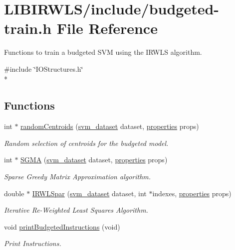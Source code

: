 \hypertarget{budgeted-train_8h}{}\section{L\+I\+B\+I\+R\+W\+L\+S/include/budgeted-\/train.h File Reference}
\label{budgeted-train_8h}


Functions to train a budgeted S\+VM using the I\+R\+W\+LS algorithm.  


{\ttfamily \#include \char`\"{}I\+O\+Structures.\+h\char`\"{}}\\*
\subsection*{Functions}
\begin{DoxyCompactItemize}
\item 
int $\ast$ \hyperlink{budgeted-train_8h_aa6c8aa8b86b7a0647cc679408c310cd3}{random\+Centroids} (\hyperlink{structsvm__dataset}{svm\+\_\+dataset} dataset, \hyperlink{structproperties}{properties} props)
\begin{DoxyCompactList}\small\item\em Random selection of centroids for the budgeted model. \end{DoxyCompactList}\item 
int $\ast$ \hyperlink{budgeted-train_8h_a50a6e1f36a010feb91db9b9b38679948}{S\+G\+MA} (\hyperlink{structsvm__dataset}{svm\+\_\+dataset} dataset, \hyperlink{structproperties}{properties} props)
\begin{DoxyCompactList}\small\item\em Sparse Greedy Matrix Approximation algorithm. \end{DoxyCompactList}\item 
double $\ast$ \hyperlink{budgeted-train_8h_ad51d9a46645ad0b0bedb1113a3807d24}{I\+R\+W\+L\+Spar} (\hyperlink{structsvm__dataset}{svm\+\_\+dataset} dataset, int $\ast$indexes, \hyperlink{structproperties}{properties} props)
\begin{DoxyCompactList}\small\item\em Iterative Re-\/\+Weighted Least Squares Algorithm. \end{DoxyCompactList}\item 
void \hyperlink{budgeted-train_8h_a9888789b1c3595806cf34f033fb2aff9}{print\+Budgeted\+Instructions} (void)
\begin{DoxyCompactList}\small\item\em Print Instructions. \end{DoxyCompactList}\item 

\end{DoxyCompactItemize}
